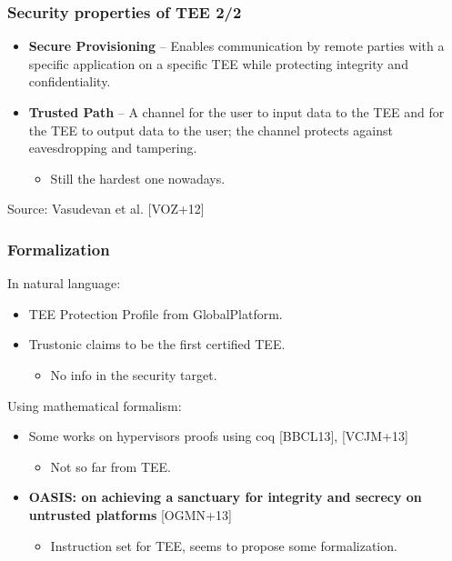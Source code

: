 \documentclass{beamer}
\begin{document}
\begin{frame}
    \frametitle{Security properties of TEE 2/2}

    \begin{itemize}
        \item {\bf Secure Provisioning} -- Enables communication by remote parties with a specific application on a specific TEE while protecting integrity and confidentiality.
        \vfill
        \item {\bf Trusted Path} -- A channel for the user to input data to the TEE and for the TEE to output data to the user; the channel protects against eavesdropping and tampering.
        \begin{itemize}
            \item Still the hardest one nowadays.
        \end{itemize}
    \end{itemize}

    \vfill
    Source: Vasudevan et al. [VOZ+12]
\end{frame}

\begin{frame}
    \frametitle{Formalization}

    \begin{block}{In natural language:}
        \begin{itemize}
            \item TEE Protection Profile from GlobalPlatform.
            \vfill
            \item Trustonic claims to be the first certified TEE.
            \begin{itemize}
                \item No info in the security target.
            \end{itemize}
        \end{itemize}
    \end{block}
    \vfill
    \begin{block}{Using mathematical formalism:}
        \begin{itemize}
            \item Some works on hypervisors proofs using coq [BBCL13], [VCJM+13]\\
            \begin{itemize}
                \item Not so far from TEE.
            \end{itemize}
            \vfill
            \item {\bf OASIS: on achieving a sanctuary for integrity and secrecy on untrusted platforms} [OGMN+13]\\
            \begin{itemize}
                \item Instruction set for TEE, seems to propose some formalization.
            \end{itemize}
        \end{itemize}
    \end{block}
\end{frame}
\end{document}
